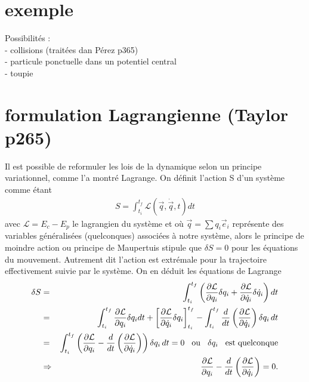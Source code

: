 \documentclass[12pt,prb,aps,epsf]{report}
\begin{document}
\section{exemple}
Possibilités :\\
	- collisions (traitées dan Pérez p365)\\
	- particule ponctuelle dans un potentiel central\\
	- toupie\\
	
\section{formulation Lagrangienne (Taylor p265)}
Il est possible de reformuler les lois de la dynamique selon un principe variationnel, comme l'a montré Lagrange. On définit l'action S d'un système comme étant 
\begin{eqnarray}
S = \int_{t_i}^{t_f} \mathcal{L}(\vec{q},\dot{\vec{q}}, t) dt
\end{eqnarray}
avec $\mathcal{L} = E_c-E_p$ le lagrangien du système et où $\vec{q} = \sum q_i\vec{e}_i$ représente des variables généralisées (quelconques) associées à notre système, alors le principe de moindre action ou principe de Maupertuis stipule que $\delta S =0$ pour les équations du mouvement. Autrement dit l'action est extrémale pour la trajectoire effectivement suivie par le système. On en déduit les équations de Lagrange 
\begin{eqnarray}
\delta S &=& \int_{t_i}^{t_f}\left(\frac{\partial \mathcal{L}}{\partial q_i} \delta q_i + \frac{\partial \mathcal{L}}{\partial \dot{q}_i}\delta \dot{q}_i\right)dt \\
&=& \int_{t_i}^{t_f}\frac{\partial \mathcal{L}}{\partial q_i} \delta q_i dt + \left[\frac{\partial\mathcal{L}}{\partial \dot{q}_i}\delta q_i\right]_{t_i}^{t_f} -\int_{t_i}^{t_f} \frac{d}{dt}\left(\frac{\partial \mathcal{L}}{\partial  \dot{q}_i}\right)\delta q_i\,dt\\
&=& \int_{t_i}^{t_f} \left(\frac{\partial \mathcal{L}}{\partial q_i}-\frac{d}{dt}\left(\frac{\partial \mathcal{L}}{\partial  \dot{q}_i}\right)\right)\delta q_i \,dt = 0 \hspace{0.3cm} \mathrm{ou}\hspace{0.3cm} \delta q_i\hspace{0.3cm} \mathrm{est}\;\mathrm{quelconque}\\
&\Rightarrow& \frac{\partial \mathcal{L}}{\partial q_i}-\frac{d}{dt}\left(\frac{\partial \mathcal{L}}{\partial  \dot{q}_i}\right) = 0.
\end{eqnarray}
\end{document}
